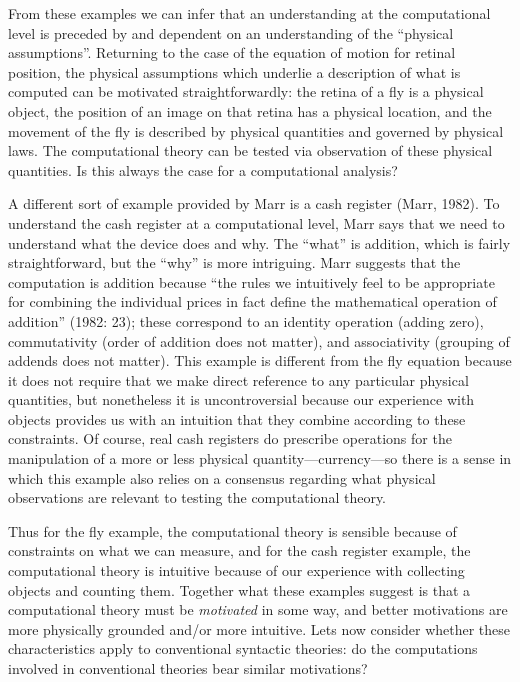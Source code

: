 From these examples we can infer that an understanding at the computational level is preceded by and dependent on an understanding of the “physical assumptions”. Returning to the case of the equation of motion for retinal position, the physical assumptions which underlie a description of what is computed can be motivated straightforwardly: the retina of a fly is a physical object, the position of an image on that retina has a physical location, and the movement of the fly is described by physical quantities and governed by physical laws. The computational theory can be tested via observation of these physical quantities. Is this always the case for a computational analysis?

A different sort of example provided by Marr is a cash register (Marr, 1982). To understand the cash register at a computational level, Marr says that we need to understand what the device does and why. The “what” is addition, which is fairly straightforward, but the “why” is more intriguing. Marr suggests that the computation is addition because “the rules we intuitively feel to be appropriate for combining the individual prices in fact define the mathematical operation of addition” (1982: 23); these correspond to an identity operation (adding zero), commutativity (order of addition does not matter), and associativity (grouping of addends does not matter). This example is different from the fly equation because it does not require that we make direct reference to any particular physical quantities, but nonetheless it is uncontroversial because our experience with objects provides us with an intuition that they combine according to these constraints. Of course, real cash registers do prescribe operations for the manipulation of a more or less physical quantity—currency—so there is a sense in which this example also relies on a consensus regarding what physical observations are relevant to testing the computational theory.

Thus for the fly example, the computational theory is sensible because of constraints on what we can measure, and for the cash register example, the computational theory is intuitive because of our experience with collecting objects and counting them. Together what these examples suggest is that a computational theory must be \textit{motivated} in some way, and better motivations are more physically grounded and/or more intuitive. Lets now consider whether these characteristics apply to conventional syntactic theories: do the computations involved in conventional theories bear similar motivations?

